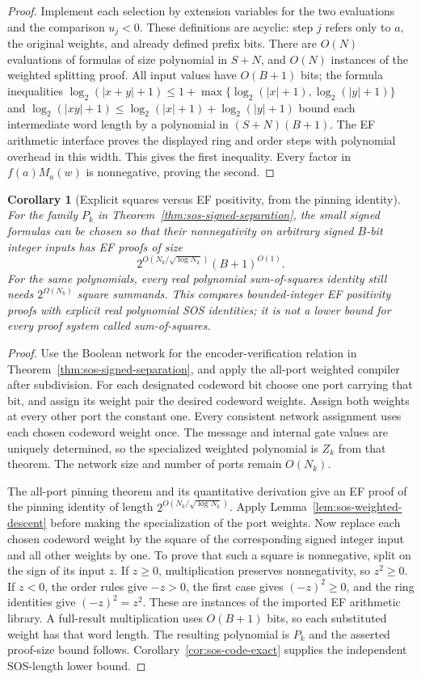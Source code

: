 \documentclass[11pt]{article}
\newtheorem{corollary}[theorem]{Corollary}
\theoremstyle{definition}
\theoremstyle{remark}
\begin{document}
\begin{proof}
Implement each selection by extension variables for the two
evaluations and the comparison $u_j<0$.
These definitions are acyclic: step $j$ refers only to $a$, the
original weights, and already defined prefix bits.
There are $O(N)$ evaluations of formulas of size polynomial in
$S+N$, and $O(N)$ instances of the weighted splitting proof.
All input values have $O(B+1)$ bits; the formula inequalities
$\log_2(|x+y|+1)\le1+\max\{\log_2(|x|+1),\log_2(|y|+1)\}$ and
$\log_2(|xy|+1)\le\log_2(|x|+1)+\log_2(|y|+1)$ bound each
intermediate word length by a polynomial in $(S+N)(B+1)$.
The EF arithmetic interface proves the displayed ring and order
steps with polynomial overhead in this width.
This gives the first inequality.
Every factor in $f(a)M_a(w)$ is nonnegative, proving the second.
\end{proof}

\begin{corollary}[Explicit squares versus EF positivity, from the pinning identity]
\label{cor:sos-ef-positivity}
For the family $P_k$ in
Theorem~\ref{thm:sos-signed-separation}, the small signed formulas
can be chosen so that their nonnegativity on arbitrary signed
$B$-bit integer inputs has EF proofs of size
\[
 2^{O(N_k/\sqrt{\log N_k})}(B+1)^{O(1)}.
\]
For the same polynomials, every real polynomial sum-of-squares
identity still needs $2^{\Omega(N_k)}$ square summands.
This compares bounded-integer EF positivity proofs with explicit
real polynomial SOS identities; it is not a lower bound for every
proof system called sum-of-squares.
\end{corollary}
\begin{proof}
Use the Boolean network for the encoder-verification relation in
Theorem~\ref{thm:sos-signed-separation}, and apply the all-port
weighted compiler after subdivision.
For each designated codeword bit choose one port carrying that
bit, and assign its weight pair the desired codeword weights.
Assign both weights at every other port the constant one.
Every consistent network assignment uses each chosen codeword
weight once.  The message and internal gate values are uniquely
determined, so the specialized weighted polynomial is $Z_k$ from
that theorem.
The network size and number of ports remain $O(N_k)$.

The all-port pinning theorem and its quantitative derivation give
an EF proof of the pinning identity of length
$2^{O(N_k/\sqrt{\log N_k})}$.
Apply Lemma~\ref{lem:sos-weighted-descent} before making the
specialization of the port weights.
Now replace each chosen codeword weight by the square of the
corresponding signed integer input and all other weights by one.
To prove that such a square is nonnegative, split on the sign of
its input $z$.  If $z\ge0$, multiplication preserves nonnegativity,
so $z^2\ge0$.  If $z<0$, the order rules give $-z>0$, the first
case gives $(-z)^2\ge0$, and the ring identities give
$(-z)^2=z^2$.  These are instances of the imported EF arithmetic
library.  A full-result multiplication uses $O(B+1)$ bits, so each
substituted weight has that word length.
The resulting polynomial is $P_k$ and the asserted proof-size
bound follows.  Corollary~\ref{cor:sos-code-exact} supplies the
independent SOS-length lower bound.
\end{proof}
\end{document}
